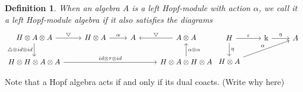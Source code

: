 \documentclass[12pt,a4paper]{article}
\newtheorem{definition}[theorem]{Definition}
\newcommand{\kk}{\Bbbk}
\newcommand\1{_{(1)}}
\newcommand\2{_{(2)}}
\begin{document}
\begin{definition}
When an algebra $A$ is a left Hopf-module with action $\alpha$, we call it a left Hopf-module algebra if it also satisfies the diagrams
\[
\begin{tikzcd}
H\otimes A\otimes A \arrow[r, "\bigtriangledown"] \arrow[d, "\triangle\otimes id\otimes id"'] & H\otimes A \arrow[r, "\alpha"] & A & A\otimes A \arrow[l, "\bigtriangledown"']                         \\
H\otimes H\otimes A\otimes A \arrow[rrr, "id\otimes\tau\otimes id"]                        &                                &   & H\otimes A\otimes H\otimes A \arrow[u, "\alpha\otimes\alpha"']
\end{tikzcd}
\begin{tikzcd}
H \arrow[r, "\varepsilon"] \arrow[d, "\eta"] & \kk \arrow[r, "\eta"] & A \\
H\otimes A \arrow[rru, "\alpha"]             &                       &  
\end{tikzcd}
\]
\end{definition}

Note that a Hopf algebra acts if and only if its dual coacts. (Write why here)
\end{document}
